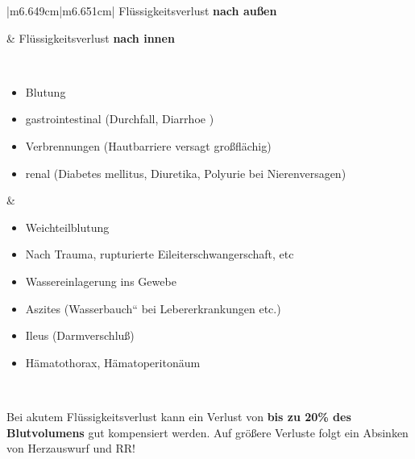 \documentclass{article}
\newcommand\gEs[1]{\textbf{\textcolor[rgb]{0.0,0.0,0.5019608}{#1}}}
\newcommand\gEs[1]{\textbf{\textcolor[rgb]{0.0,0.0,0.5019608}{#1}}}
\newcommand\gZ[1]{\textcolor[rgb]{0.5019608,0.5019608,0.5019608}{#1}}
\begin{document}
\begin{center}
\tablehead{}\begin{supertabular}{|m{6.649cm}|m{6.651cm}|}
\hline
{\mdseries Fl\"ussigkeitsverlust \gEs{nach
au{\ss}en}}

 &
{\mdseries Fl\"ussigkeitsverlust \gEs{nach innen}}

\\\hline
\begin{itemize}
\item {\mdseries Blutung}

\item {\mdseries gastrointestinal (Durchfall, Diarrhoe )}

\item {\mdseries Verbrennungen (Hautbarriere versagt 
gro{\ss}\-fl\"achig)}

\item {\mdseries renal (Diabetes mellitus, Diuretika, Polyurie bei 
Nierenversagen)}

\end{itemize}
 &
\begin{itemize}
\item {\mdseries Weichteilblutung}

\end{itemize}
\begin{itemize}
\item {\mdseries Nach Trauma, rupturierte Eileiter\-schwanger\-schaft,
etc}

\end{itemize}
\begin{itemize}
\item {\mdseries Wassereinlagerung ins Gewebe}

\item {\mdseries \gZ{Aszites
({\quotedblbase}Wasserbauch{\textquotedblleft} bei Lebererkrankungen 
etc.)}}

\item {\mdseries Ileus (Darmverschlu{\ss})}

\item {\mdseries H\"amatothorax, H\"amatoperiton\"aum}

\end{itemize}
\\\hline
\end{supertabular}
\end{center}
{\mdseries
Bei akutem Fl\"ussigkeitsverlust kann ein Verlust von
\gEs{bis zu 20\% des Blutvolumens}  gut kompensiert
werden. Auf gr\"o{\ss}ere Verluste  folgt ein Absinken von Herzauswurf
und RR!}
\end{document}
